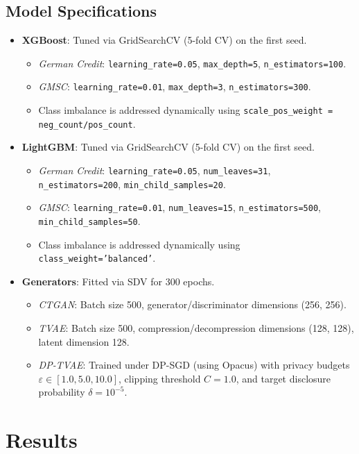 \documentclass[journal]{IEEEtran}
\begin{document}
\subsection{Model Specifications}
\begin{itemize}
    \item \textbf{XGBoost}: Tuned via GridSearchCV (5-fold CV) on the first seed.
    \begin{itemize}
        \item \textit{German Credit}: \texttt{learning\_rate=0.05}, \texttt{max\_depth=5}, \texttt{n\_estimators=100}.
        \item \textit{GMSC}: \texttt{learning\_rate=0.01}, \texttt{max\_depth=3}, \texttt{n\_estimators=300}.
        \item Class imbalance is addressed dynamically using \texttt{scale\_pos\_weight = neg\_count/pos\_count}.
    \end{itemize}
    \item \textbf{LightGBM}: Tuned via GridSearchCV (5-fold CV) on the first seed.
    \begin{itemize}
        \item \textit{German Credit}: \texttt{learning\_rate=0.05}, \texttt{num\_leaves=31}, \texttt{n\_estimators=200}, \texttt{min\_child\_samples=20}.
        \item \textit{GMSC}: \texttt{learning\_rate=0.01}, \texttt{num\_leaves=15}, \texttt{n\_estimators=500}, \texttt{min\_child\_samples=50}.
        \item Class imbalance is addressed dynamically using \texttt{class\_weight='balanced'}.
    \end{itemize}
    \item \textbf{Generators}: Fitted via SDV for 300 epochs.
    \begin{itemize}
        \item \textit{CTGAN}: Batch size 500, generator/discriminator dimensions (256, 256).
        \item \textit{TVAE}: Batch size 500, compression/decompression dimensions (128, 128), latent dimension 128.
        \item \textit{DP-TVAE}: Trained under DP-SGD (using Opacus) with privacy budgets $\varepsilon \in [1.0, 5.0, 10.0]$, clipping threshold $C = 1.0$, and target disclosure probability $\delta = 10^{-5}$.
    \end{itemize}
\end{itemize}

\section{Results}
\label{sec:results}
\end{document}
